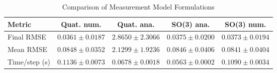 \begin{table}[htbp]
\centering
\caption{Comparison of Measurement Model Formulations}
\label{tab:method_comparison}
\begin{tabular}{lcccc}
\hline
Metric & Quat. num. & Quat. ana. & SO(3) ana. & SO(3) num. \\
\hline
Final RMSE & $0.0361 \pm 0.0187$ & $2.8650 \pm 2.3066$ & $0.0375 \pm 0.0200$ & $0.0373 \pm 0.0194$ \\
Mean RMSE & $0.0848 \pm 0.0352$ & $2.1299 \pm 1.9236$ & $0.0846 \pm 0.0406$ & $0.0841 \pm 0.0404$ \\
Time/step (s) & $0.1136 \pm 0.0073$ & $0.0678 \pm 0.0018$ & $0.0563 \pm 0.0002$ & $0.1090 \pm 0.0034$ \\
\hline
\end{tabular}
\end{table}
